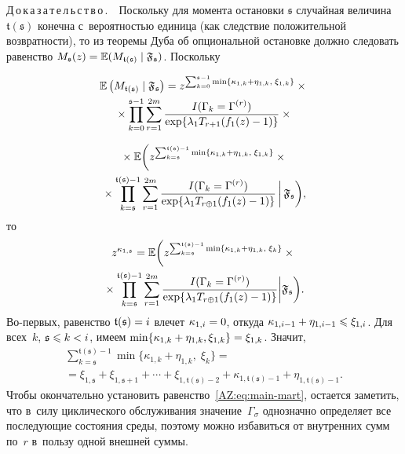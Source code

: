 \begin{multicols}{2}
\noindent
Д\,о\,к\,а\,з\,а\,т\,е\,л\,ь\,с\,т\,в\,о\,.\ \
  Поскольку для момента остановки $\mathfrak s$ случайная величина
  $\mathfrak t(\mathfrak s)$ конечна с~вероятностью единица (как следствие
  положительной возвратности), то из теоремы Дуба об опциональной остановке
  должно следовать равенство
  $M_{\mathfrak s}(z) \hm= \mathbb E(M_{\mathfrak t(\mathfrak s)} \mid \mathfrak
  F_{\mathfrak s})$. Поскольку
  
  \noindent
\begin{multline*}
  \mathbb {E}\left(M_{\mathfrak t(\mathfrak s)} \mid \mathfrak F_{\mathfrak{s}}\right) =
  z^{\sum\nolimits_{k=0}^{\mathfrak{s}-
1}\min\{\kappa_{1,k}+\eta_{1,k},\;\xi_{1,k}\}}\times{}\\
{}\times
  \prod\limits_{k=0}^{\mathfrak s-1}\sum\limits_{r=1}^{2m}
  \displaystyle\frac{\displaystyle I(\Gamma_{k}=\Gamma^{(r)})\mathstrut}{\displaystyle \exp\{\lambda_{1}T_{r+1}(f_{1}(z)-
1)\}\mathstrut}\times{}
\end{multline*}

\noindent
\begin{multline*}
{}  \times\mathbb{E}\biggl(z^{\sum\nolimits_{k=\mathfrak s}^{\mathfrak t(\mathfrak
      s)-1}\min\{\kappa_{1,k}+\eta_{1,k},\;\xi_{1,k}\}}\times{}\\
      {}\times \prod\limits_{k=\mathfrak
    s}^{\mathfrak t(\mathfrak s)-1}\sum\limits_{r=1}^{2m}
  \fr{I(\Gamma_{k}=\Gamma^{(r)})}%
  {\exp\{\lambda_{1}T_{r\oplus1}(f_{1}(z)-1)\}}\,\bigg|\,\mathfrak{F}_{\mathfrak 
s}\biggr),
\end{multline*}
то
\begin{multline*}
  z^{\kappa_{1,\mathfrak s}}=
  \mathbb{E}\biggl(z^{\sum\nolimits_{k=\mathfrak s}^{\mathfrak t(\mathfrak s)-1}
    \min\{\kappa_{1,k}+\eta_{1,k},\;\xi_{k}\}}\times{}\\
    {}\times \prod\limits_{k=\mathfrak s}^{\mathfrak
    t(\mathfrak s)-1}
  \sum\limits_{r=1}^{2m}\fr{I(\Gamma_{k}=\Gamma^{(r)})}%
  {\exp\{\lambda_{1}T_{r\oplus1}(f_{1}(z)-1)\}}\bigg|\mathfrak{F}_{\mathfrak 
s}\bigg).
\end{multline*}
Во-первых, равенство $\mathfrak t(\mathfrak s)\hm=i$ влечет $\kappa_{1,i}\hm=0$,
откуда $\kappa_{1,i-1}\hm+\eta_{1,i-1}\hm\leqslant\xi_{1,i}$. Для всех~$k$,
$\mathfrak {s} \hm\leqslant k\hm<i$, имеем
$\min\{\kappa_{1,k}\hm+\eta_{1,k},\xi_{1,k}\}=\xi_{1,k}$. Значит,
\begin{multline*}
  \sum\limits_{k=\mathfrak s}^{\mathfrak t(\mathfrak s)-1}
  \min\{\kappa_{1,k}+\eta_{1,k},\;\xi_{k}\}={}\\
  {}= \xi_{1,\mathfrak
    s}+\xi_{1,\mathfrak s+1}+\cdots+\xi_{1,\mathfrak t(\mathfrak s)-2}+
  \kappa_{1,\mathfrak t(\mathfrak s)-1}+\eta_{1,\mathfrak t(\mathfrak s)-1}.
\end{multline*}
Чтобы окончательно установить равенство~\eqref{AZ:eq:main-mart}, остается
заметить, что в~силу циклического обслуживания значение~$\Gamma_{\sigma}$
однозначно определяет все последующие состояния среды, поэтому можно избавиться
от внутренних сумм по~$r$ в~пользу одной внешней суммы.



\end{multicols}

